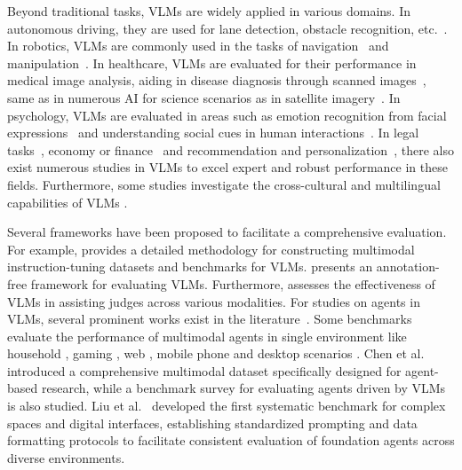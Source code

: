 Beyond traditional tasks, VLMs are widely applied in various domains. In autonomous driving, they are used for lane detection, obstacle recognition, etc.~\cite{cui2024survey, tian2024drivevlm, li2024survey, huang2024survey}. In robotics, VLMs are commonly used in the tasks of navigation~\cite{guan2024loczson, Dorbala2022CLIPNavUC, shah2023vint, elnoor2024robotnav, arul2024vlpgnav, weerakoon2024behavbehavior} and manipulation~\cite{ichter2022do, ren2023robots, palme, fangandliu2024moka}. In healthcare, VLMs are evaluated for their performance in medical image analysis, aiding in disease diagnosis through scanned images~\cite{hartsock2024vision, royer2024multimedeval}, same as in numerous AI for science scenarios as in satellite imagery~\cite{li2024vision}. In psychology, VLMs are evaluated in areas such as emotion recognition from facial expressions~\cite{foteinopoulou2024emoclip} and understanding social cues in human interactions~\cite{kim2024understanding}. In legal tasks~\cite{louis2024interpretable}, economy or finance~\cite{lu2024deepseek} and recommendation and personalization~\cite{wu2024survey}, there also exist numerous studies in VLMs to excel expert and robust performance in these fields. Furthermore, some studies investigate the cross-cultural and multilingual capabilities of VLMs \cite{inoue2024heron, baek2024evaluating}.

Several frameworks have been proposed to facilitate a comprehensive evaluation. For example, \cite{yin2024lamm} provides a detailed methodology for constructing multimodal instruction-tuning datasets and benchmarks for VLMs. \cite{cao2024introducing} presents an annotation-free framework for evaluating VLMs. Furthermore, \cite{chen2024mllm} assesses the effectiveness of VLMs in assisting judges across various modalities. For studies on agents in VLMs, several prominent works exist in the literature~\cite{liu2023agentbench, liu2024visualagentbench}. Some benchmarks evaluate the performance of multimodal agents in single environment like household \cite{shridhar2020alfred,shridhar2020alfworld}, gaming \cite{wu2023smartplay}, web \cite{deng2024mind2web,koh2024visualwebarena,jang2024videowebarena}, mobile phone \cite{rawles2024androidinthewild,sun2022meta,rawles2024androidworld} and desktop scenarios \cite{xie2024osworld,bonatti2024windows,kapoor2025omniact}. Chen et al.~\cite{chen2024gui} introduced a comprehensive multimodal dataset specifically designed for agent-based research, while a benchmark survey for evaluating agents driven by VLMs is also studied. Liu et al.~\cite{liu2024visualagentbench} developed the first systematic benchmark for complex spaces and digital interfaces, establishing standardized prompting and data formatting protocols to facilitate consistent evaluation of foundation agents across diverse environments.











